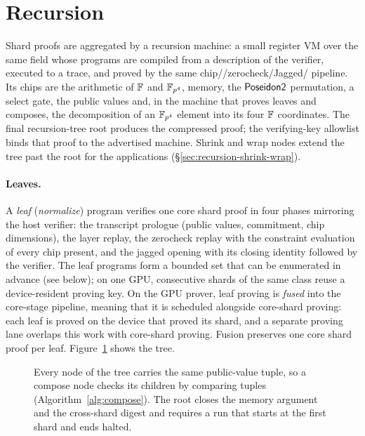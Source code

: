 \section{Recursion}
\label{sec:recursion}

Shard proofs are aggregated by a recursion machine: a small register VM over the same field whose programs are compiled from a description of the verifier, executed to a trace, and proved by the same chip/\LogUp{}/zerocheck/Jagged/\WHIR{} pipeline. Its chips are the arithmetic of $\mathbb{F}$ and $\mathbb{F}_{p^4}$, memory, the $\mathsf{Poseidon2}{}$ permutation, a select gate, the public values and, in the machine that proves leaves and composes, the decomposition of an $\mathbb{F}_{p^4}$ element into its four $\mathbb{F}$ coordinates. The final recursion-tree root produces the compressed proof; the verifying-key allowlist binds that proof to the advertised machine. Shrink and wrap nodes extend the tree past the root for the applications (\S\ref{sec:recursion-shrink-wrap}).

\paragraph{Leaves.} A \emph{leaf} (\emph{normalize}) program verifies one core shard proof in four phases mirroring the host verifier: the transcript prologue (public values, commitment, chip dimensions), the \LogUp{} layer replay, the zerocheck replay with the constraint evaluation of every chip present, and the jagged opening with its closing identity followed by the \WHIR{} verifier. The leaf programs form a bounded set that can be enumerated in advance (see below); on one GPU, consecutive shards of the same class reuse a device-resident proving key. On the GPU prover, leaf proving is \emph{fused} into the core-stage pipeline, meaning that it is scheduled alongside core-shard proving: each leaf is proved on the device that proved its shard, and a separate proving lane overlaps this work with core-shard proving. Fusion preserves one core shard proof per leaf. Figure~\ref{fig:recursion} shows the tree.

\begin{figure}[t]
\centering
\resizebox{0.96\textwidth}{!}{}
\caption{Every node of the tree carries the same public-value tuple, so a
compose node checks its children by comparing tuples (Algorithm~\ref{alg:compose}).
The root closes the memory argument and the cross-shard digest and requires
a run that starts at the first shard and ends halted.}
\label{fig:recursion}
\end{figure}

